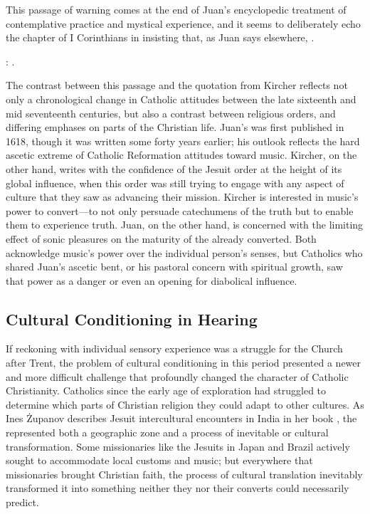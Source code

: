 This passage of warning comes at the end of Juan's encyclopedic treatment of contemplative practice and mystical experience, and it seems to deliberately echo the  chapter of I Corinthians in insisting that, as Juan says elsewhere, .%
\begin{Footnote}
    \Autocite[\XXX]{JuandelaCruz:Subida}: \XXX[original].
\end{Footnote}
The contrast between this passage and the quotation from Kircher reflects not only a chronological change in Catholic attitudes between the late sixteenth and mid seventeenth centuries, but also a contrast between religious orders, and differing emphases on parts of the Christian life.
Juan's  was first published in 1618, though it was written some forty years earlier; his outlook reflects the hard ascetic extreme of Catholic Reformation attitudes toward music.
Kircher, on the other hand, writes with the confidence of the Jesuit order at the height of its global influence, when this order was still trying to engage with any aspect of culture that they saw as advancing their mission.
Kircher is interested in music's power to convert---to not only persuade catechumens of the truth but to enable them to experience truth.
Juan, on the other hand, is concerned with the limiting effect of sonic pleasures on the maturity of the already converted.
Both acknowledge music's power over the individual person's senses, but Catholics who shared Juan's ascetic bent, or his pastoral concern with spiritual growth, saw that power as a danger or even an opening for diabolical influence.

\subsection{Cultural Conditioning in Hearing}

If reckoning with individual sensory experience was a struggle for the Church after Trent, the problem of cultural conditioning in this period presented a newer and more difficult challenge that profoundly changed the character of Catholic Christianity.
Catholics since the early age of exploration had struggled to determine which parts of Christian religion they could adapt to other cultures.
As Ines Żupanov describes Jesuit intercultural encounters in India in her book , the  represented both a geographic zone and a process of inevitable  or cultural transformation.%
    \Autocite[\XXX]{Zupanov:MissionaryTropics}
Some missionaries like the Jesuits in Japan and Brazil actively sought to accommodate local customs and music; but everywhere that missionaries brought Christian faith, the process of cultural translation inevitably transformed it into something neither they nor their converts could necessarily predict.
    \Autocites{Bailey:Art}{Waterhouse:EarliestJapaneseContacts}
{Castagna:JesuitsConversionBrazil}

